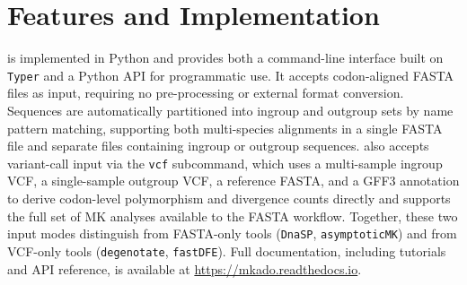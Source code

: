 \section{Features and Implementation}

\mkado is implemented in Python
and provides both a command-line interface built on
\texttt{Typer} and a Python API for programmatic use.
It accepts codon-aligned FASTA files as input,
requiring no pre-processing or external format conversion.
Sequences are automatically partitioned into ingroup and outgroup sets
by name pattern matching,
supporting both multi-species alignments in a single FASTA file
and separate files containing ingroup or outgroup sequences.
\mkado{} also accepts variant-call
input via the \texttt{vcf} subcommand, which uses a multi-sample
ingroup VCF, a single-sample outgroup VCF, a reference FASTA, and a
GFF3 annotation to derive codon-level polymorphism and divergence
counts directly and supports the full set of MK analyses available
to the FASTA workflow. Together, these two input modes distinguish
\mkado{} from FASTA-only tools (\texttt{DnaSP}, \texttt{asymptoticMK})
and from VCF-only tools (\texttt{degenotate}, \texttt{fastDFE}).
Full documentation, including tutorials and API reference,
is available at \url{https://mkado.readthedocs.io}.

